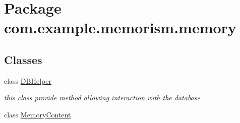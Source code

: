 \hypertarget{namespacecom_1_1example_1_1memorism_1_1memory}{}\section{Package com.\+example.\+memorism.\+memory}
\label{namespacecom_1_1example_1_1memorism_1_1memory}
\subsection*{Classes}
\begin{DoxyCompactItemize}
\item 
class \hyperlink{classcom_1_1example_1_1memorism_1_1memory_1_1_d_b_helper}{D\+B\+Helper}
\begin{DoxyCompactList}\small\item\em this class provide method allowing interaction with the database \end{DoxyCompactList}\item 
class \hyperlink{classcom_1_1example_1_1memorism_1_1memory_1_1_memory_content}{Memory\+Content}
\end{DoxyCompactItemize}
